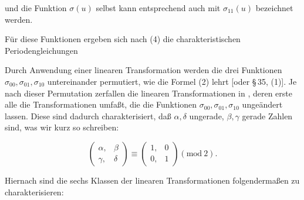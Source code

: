 und die Funktion $\sigma(u)$ selbst kann entsprechend auch mit $\sigma_{11}(u)$ bezeichnet werden.

Für diese Funktionen ergeben sich nach (4) die charakteristischen Periodengleichungen


Durch Anwendung einer linearen Transformation werden die drei Funktionen $\sigma_{00}, \sigma_{01}, \sigma_{10}$ untereinander permutiert, wie die Formel (2) lehrt [oder \S\,35, (1)]. Je nach dieser Permutation zerfallen die linearen Transformationen in , deren erste alle die Transformationen umfaßt, die die Funktionen $\sigma_{00}, \sigma_{01}, \sigma_{10}$ ungeändert lassen. Diese sind dadurch charakterisiert, daß $\alpha, \delta$ ungerade, $\beta, \gamma$ gerade Zahlen sind, was wir kurz so schreiben:

\[
\begin{pmatrix}\alpha, & \beta\\ \gamma, & \delta\end{pmatrix} \equiv \begin{pmatrix}1, & 0\\ 0, & 1\end{pmatrix} (\mathrm{mod}\ 2).
\]

Hiernach sind die sechs Klassen der linearen Transformationen folgendermaßen zu charakterisieren:

